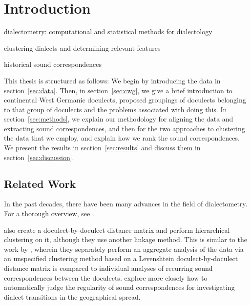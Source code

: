 \documentclass[a4paper]{article}
\begin{document}
\newpage
\tableofcontents
\newpage
\listoftables
\listoffigures
\newpage



\section{Introduction}


dialectometry: computational and statistical methods for dialectology

clustering dialects and determining relevant features

historical sound correspondences


This thesis is structured as follows:
We begin by introducing the data in section~\ref{sec:data}.
Then, in section~\ref{sec:cwg},
we give a brief introduction to continental West Germanic doculects,
proposed groupings of doculects belonging to that group of doculects
and the problems associated with doing this.
In section~\ref{sec:methods}, we explain our methodology for
aligning the data and extracting sound correspondences,
and then for the two approaches to clustering the data that we employ,
and explain how we rank the sound correspondences.
We present the results in section~\ref{sec:results}
and discuss them in section~\ref{sec:discussion}.

\subsection{Related Work}

In the past decades, there have been many advances in the field of dialectometry.
For a thorough overview, see \citet{wieling2015advances}.

\citet{prokic2012detecting} also create
a doculect-by-doculect distance matrix %
and perform hierarchical clustering on it,
although they use another linkage method.
This is similar to the work by \citet{prokic2007identifying},
wherein they separately perform an aggregate analysis of the
data via an unspecified clustering method based on a Levenshtein
doculect-by-doculect distance matrix
is compared to individual analyses of recurring sound correspondences
between the doculects.
\citet{prokic2013combining} explore more closely how
to automatically judge the regularity of sound correspondences
for investigating dialect transitions in the geographical spread.
\end{document}

